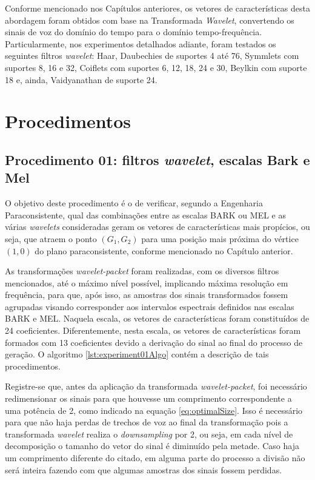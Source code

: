 		\par Conforme mencionado nos Capítulos anteriores, os vetores de características desta abordagem foram obtidos com base na Transformada \textit{Wavelet}, convertendo os sinais de voz do domínio do tempo para o domínio tempo-frequência. Particularmente, nos experimentos detalhados adiante, foram testados os seguintes filtros \textit{wavelet}: Haar, Daubechies de suportes 4 até 76, Symmlets com suportes 8, 16 e 32, Coiflets com suportes 6, 12, 18, 24 e 30, Beylkin com suporte 18 e, ainda, Vaidyanathan de suporte 24.

	\section{Procedimentos}
		\subsection{Procedimento 01: filtros \textit{wavelet}, escalas Bark e Mel}
		\label{chap:propApproach:sec:Experimento01}
		\par O objetivo deste procedimento é o de verificar, segundo a Engenharia Paraconsistente, qual das combinações entre as escalas BARK ou MEL e as várias \textit{wavelets} consideradas geram os vetores de características mais propícios, ou seja, que atraem o ponto $(G_1,G_2)$ para uma posição mais próxima do vértice $(1,0)$ do plano paraconsistente, conforme mencionado no Capítulo anterior. 
				
		\par As transformações \textit{wavelet-packet} foram realizadas, com os diversos filtros mencionados, até  o máximo nível possível, implicando máxima resolução em frequência, para que, após isso, as amostras dos sinais transformados fossem agrupadas visando corresponder aos intervalos espectrais definidos nas escalas BARK e MEL. Naquela escala, os vetores de características foram constituídos de 24 coeficientes. Diferentemente, nesta escala, os vetores de características foram formados com 13 coeficientes devido a derivação do sinal ao final do processo de geração. O algoritmo \ref{lst:experiment01Algo} contém a descrição de tais procedimentos.
			
		

		\par Registre-se que, antes da aplicação da transformada \textit{wavelet-packet}, foi necessário redimensionar os sinais para que houvesse um comprimento correspondente a uma potência de 2, como indicado na equação \ref{eq:optimalSize}. Isso é necessário para que não haja perdas de trechos de voz ao final da transformação pois a transformada \textit{wavelet} realiza o \textit{downsampling} por 2, ou seja, em cada nível de decomposição o tamanho do vetor do sinal é diminuído pela metade. Caso haja um comprimento diferente do citado, em alguma parte do processo a divisão não será inteira fazendo com que algumas amostras dos sinais fossem perdidas.
				
